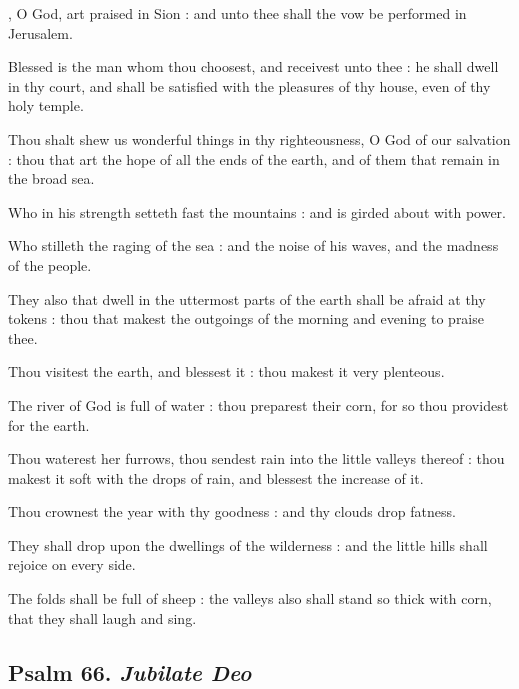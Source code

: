 , O God, art praised in Sion : and unto thee shall the vow be performed in Jerusalem.\par
{}
Blessed is the man whom thou choosest, and receivest unto thee : he shall dwell in thy court, and shall be satisfied with the pleasures of thy house, even of thy holy temple.\par
{}Thou shalt shew us wonderful things in thy righteousness, O God of our salvation : thou that art the hope of all the ends of the earth, and of them that remain in the broad sea.\par
{}Who in his strength setteth fast the mountains : and is girded about with power.\par
{}Who stilleth the raging of the sea : and the noise of his waves, and the madness of the people.\par
{}They also that dwell in the uttermost parts of the earth shall be afraid at thy tokens : thou that makest the outgoings of the morning and evening to praise thee.\par
{}Thou visitest the earth, and blessest it : thou makest it very plenteous.\par
{}The river of God is full of water : thou preparest their corn, for so thou providest for the earth.\par
{}Thou waterest her furrows, thou sendest rain into the little valleys thereof : thou makest it soft with the drops of rain, and blessest the increase of it.\par
{}Thou crownest the year with thy goodness : and thy clouds drop fatness.\par
{}They shall drop upon the dwellings of the wilderness : and the little hills shall rejoice on every side.\par
{}The folds shall be full of sheep : the valleys also shall stand so thick with corn, that they shall laugh and sing.\par

\subsection{Psalm 66. \textit{Jubilate Deo}}

